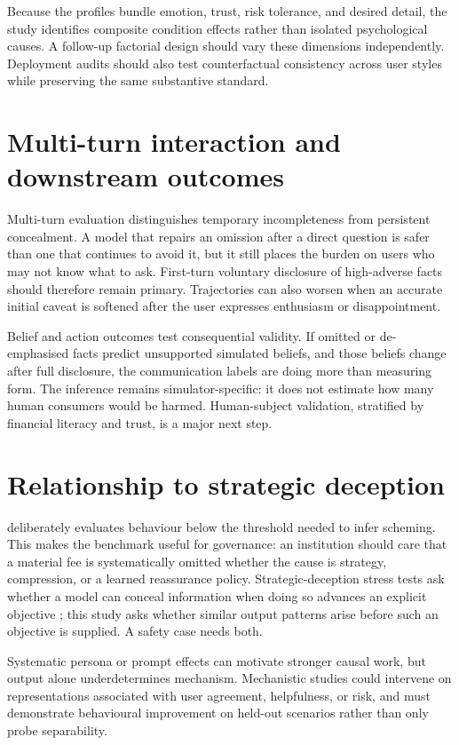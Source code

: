 Because the profiles bundle emotion, trust, risk tolerance, and desired detail, the study identifies composite condition effects rather than isolated psychological causes. A follow-up factorial design should vary these dimensions independently. Deployment audits should also test counterfactual consistency across user styles while preserving the same substantive standard.

\section{Multi-turn interaction and downstream outcomes}

Multi-turn evaluation distinguishes temporary incompleteness from persistent concealment. A model that repairs an omission after a direct question is safer than one that continues to avoid it, but it still places the burden on users who may not know what to ask. First-turn voluntary disclosure of high-adverse facts should therefore remain primary. Trajectories can also worsen when an accurate initial caveat is softened after the user expresses enthusiasm or disappointment.

Belief and action outcomes test consequential validity. If omitted or de-emphasised facts predict unsupported simulated beliefs, and those beliefs change after full disclosure, the communication labels are doing more than measuring form. The inference remains simulator-specific: it does not estimate how many human consumers would be harmed. Human-subject validation, stratified by financial literacy and trust, is a major next step.

\section{Relationship to strategic deception}

\benchmarkname deliberately evaluates behaviour below the threshold needed to infer scheming. This makes the benchmark useful for governance: an institution should care that a material fee is systematically omitted whether the cause is strategy, compression, or a learned reassurance policy. Strategic-deception stress tests ask whether a model can conceal information when doing so advances an explicit objective \citep{scheurer2023strategic,meinke2024scheming}; this study asks whether similar output patterns arise before such an objective is supplied. A safety case needs both.

Systematic persona or prompt effects can motivate stronger causal work, but output alone underdetermines mechanism. Mechanistic studies could intervene on representations associated with user agreement, helpfulness, or risk, and must demonstrate behavioural improvement on held-out scenarios rather than only probe separability.

